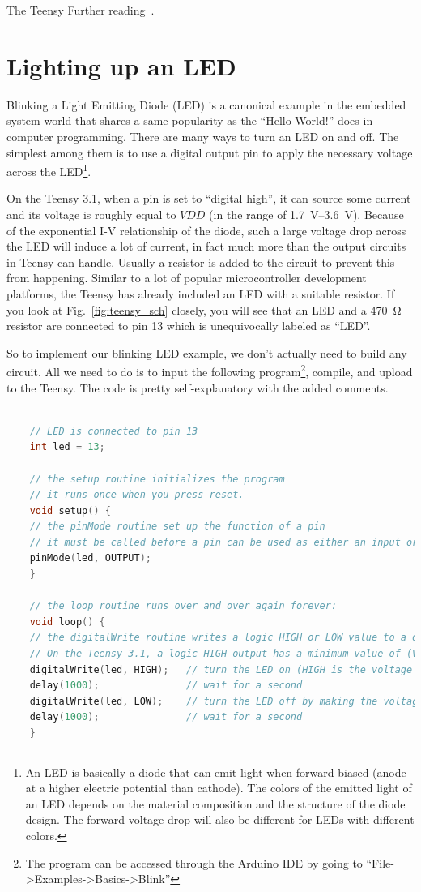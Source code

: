 \documentclass[letterpaper, 11pt]{article}
\begin{document}
The Teensy 
Further reading~\cite{bib:uC_intro1, bib:uC_intro2}.

\section{Lighting up an LED}
Blinking a Light Emitting Diode (LED) is a canonical example in the embedded system world that shares a same popularity as the ``Hello World!'' does in computer programming. There are many ways to turn an LED on and off. The simplest among them is to use a digital output pin to apply the necessary voltage across the LED\footnote{An LED is basically a diode that can emit light when forward biased (anode at a higher electric potential than cathode). The colors of the emitted light of an LED depends on the material composition and the structure of the diode design. The forward voltage drop will also be different for LEDs with different colors.}. 

On the Teensy 3.1, when a pin is set to ``digital high'', it can source some current and its voltage is roughly equal to $VDD$ (in the range of \SIrange{1.7}{3.6}{\volt}). Because of the exponential I-V relationship of the diode, such a large voltage drop across the LED will induce a lot of current, in fact much more than the output circuits in Teensy can handle. Usually a resistor is added to the circuit to prevent this from happening. Similar to a lot of popular microcontroller development platforms, the Teensy has already included an LED with a suitable resistor. If you look at Fig.~\ref{fig:teensy_sch} closely, you will see that an LED and a \SI{470}{\ohm} resistor are connected to pin 13 which is unequivocally labeled as ``LED''. 

So to implement our blinking LED example, we don't actually need to build any circuit. All we need to do is to input the following program\footnote{The program can be accessed through the Arduino IDE by going to ``File-\textgreater Examples-\textgreater Basics-\textgreater Blink''}, compile, and upload to the Teensy. The code is pretty self-explanatory with the added comments. 

\begin{lstlisting}[language=C]

	// LED is connected to pin 13
	int led = 13;
	
	// the setup routine initializes the program
	// it runs once when you press reset. 
	void setup() {                
	// the pinMode routine set up the function of a pin
	// it must be called before a pin can be used as either an input or output device
	pinMode(led, OUTPUT);     
	}
	
	// the loop routine runs over and over again forever:
	void loop() {
	// the digitalWrite routine writes a logic HIGH or LOW value to a digital pin
	// On the Teensy 3.1, a logic HIGH output has a minimum value of (VDD-0.5) V and a logic LOW has a maximum value of 0.5 V.
	digitalWrite(led, HIGH);   // turn the LED on (HIGH is the voltage level)
	delay(1000);               // wait for a second
	digitalWrite(led, LOW);    // turn the LED off by making the voltage LOW
	delay(1000);               // wait for a second
	}
\end{lstlisting}
\end{document}
